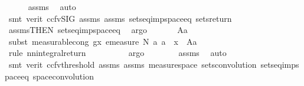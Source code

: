 \begin{isabellebody}
\ \ \ \ \isamarkupfalse%
\ assms\ \isamarkupfalse%
\ auto{\isacharbrackleft}{\kern0pt}{}{\isacharbrackright}{\kern0pt}\isanewline
\ \ \ \ \isamarkupfalse%
\ {\isacharparenleft}{\kern0pt}smt\ {\isacharparenleft}{\kern0pt}verit{\isacharcomma}{\kern0pt}\ ccfv{\isacharunderscore}{\kern0pt}SIG{\isacharparenright}{\kern0pt}\ assms{\isacharparenleft}{\kern0pt}{}{\isacharparenright}{\kern0pt}\ assms{\isacharparenleft}{\kern0pt}{}{\isacharparenright}{\kern0pt}\ sets{\isacharunderscore}{\kern0pt}eq{\isacharunderscore}{\kern0pt}imp{\isacharunderscore}{\kern0pt}space{\isacharunderscore}{\kern0pt}eq\ sets{\isacharunderscore}{\kern0pt}return{\isacharparenright}{\kern0pt}\isanewline
\ \ \ \ \isamarkupfalse%
\ assms{\isacharparenleft}{\kern0pt}{}{\isacharparenright}{\kern0pt}{\isacharbrackleft}{\kern0pt}THEN\ sets{\isacharunderscore}{\kern0pt}eq{\isacharunderscore}{\kern0pt}imp{\isacharunderscore}{\kern0pt}space{\isacharunderscore}{\kern0pt}eq{\isacharbrackright}{\kern0pt}\ \isamarkupfalse%
\ argo\isanewline
\ \ \ \ \isamarkupfalse%
\ \ A{\isacharprime}{\kern0pt}a\ \isanewline
\ \ \ \ \ \ \isamarkupfalse%
\ {\isacharparenleft}{\kern0pt}subst\ measurable{\isacharunderscore}{\kern0pt}cong{\isacharbrackleft}{\kern0pt}\ g{\isacharequal}{\kern0pt}{\isachardoublequoteopen}{\isasymlambda}x{\isachardot}{\kern0pt}\ emeasure\ N\ {\isacharbraceleft}{\kern0pt}a{\isachardot}{\kern0pt}\ a\ {\isacharplus}{\kern0pt}\ x\ {\isasymin}\ A{\isacharprime}{\kern0pt}a{\isacharbraceright}{\kern0pt}{\isachardoublequoteclose}{\isacharbrackright}{\kern0pt}{\isacharparenright}{\kern0pt}\isanewline
\ \ \ \ \ \ \isamarkupfalse%
\ {\isacharparenleft}{\kern0pt}rule\ nn{\isacharunderscore}{\kern0pt}integral{\isacharunderscore}{\kern0pt}return{\isacharparenright}{\kern0pt}\isanewline
\ \ \ \ \ \ \ \ \isamarkupfalse%
\ argo\isanewline
\ \ \ \ \ \ \isamarkupfalse%
\ assms\ \isamarkupfalse%
\ auto\isanewline
\ \ \ \ \isamarkupfalse%
\ {\isacharparenleft}{\kern0pt}smt\ {\isacharparenleft}{\kern0pt}verit{\isacharcomma}{\kern0pt}\ ccfv{\isacharunderscore}{\kern0pt}threshold{\isacharparenright}{\kern0pt}\ assms{\isacharparenleft}{\kern0pt}{}{\isacharparenright}{\kern0pt}\ assms{\isacharparenleft}{\kern0pt}{}{\isacharparenright}{\kern0pt}\ measure{\isacharunderscore}{\kern0pt}space\ sets{\isacharunderscore}{\kern0pt}convolution\ sets{\isacharunderscore}{\kern0pt}eq{\isacharunderscore}{\kern0pt}imp{\isacharunderscore}{\kern0pt}space{\isacharunderscore}{\kern0pt}eq\ space{\isacharunderscore}{\kern0pt}convolution{\isacharparenright}{\kern0pt}\isanewline

\end{isabellebody}
